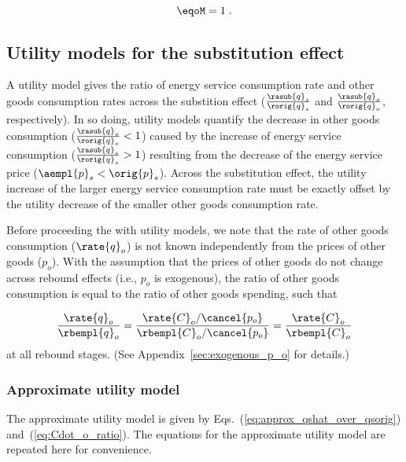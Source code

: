 \begin{equation} \label{eq:eqoM}
  \eqoM = 1 \; .
\end{equation}


\subsection{Utility models for the substitution effect}
\label{sec:utility_models_sub}

A utility model gives the ratio of energy service consumption rate 
and other goods consumption rates across the substition effect
($\frac{\rasub{q}_s}{\rorig{q}_s}$ and 
$\frac{\rasub{q}_o}{\rorig{q}_o}$, 
respectively).
In so doing, 
utility models quantify the decrease in other goods consumption
($\frac{\rasub{q}_o}{\rorig{q}_o} < 1$)
caused by the increase of energy service consumption
($\frac{\rasub{q}_s}{\rorig{q}_s} > 1$)
resulting from the decrease of the energy service price ($\aempl{p}_s < \orig{p}_s$).
Across the substitution effect, 
the utility increase of the larger energy service consumption rate
must be exactly offset
by the utility decrease of the smaller other goods consumption rate.

Before proceeding the with utility models,
we note that the rate of other goods consumption ($\rate{q}_o$)
is not known independently from the prices of other goods ($p_o$).
With the assumption that the prices of other goods do not change
across rebound effects
(i.e., $p_o$ is exogenous), 
the ratio of other goods consumption is equal to 
the ratio of other goods spending, such that

\begin{equation} \label{eq:exogenous_p_o}
  \frac{\rate{q}_o}{\rbempl{q}_o} 
      = \frac{\rate{C}_o/\cancel{p_o}}{\rbempl{C}_o/\cancel{p_o}} 
      = \frac{\rate{C}_o}{\rbempl{C}_o}
\end{equation}
%
at all rebound stages. 
(See Appendix~\ref{sec:exogenous_p_o} for details.)


\subsubsection{Approximate utility model} 
\label{sec:derivation_approx_utility_model}

The approximate utility model is given by Eqs.~(\ref{eq:approx_qshat_over_qsorig})
and~(\ref{eq:Cdot_o_ratio}).
The equations for the approximate utility model are repeated here
for convenience.

